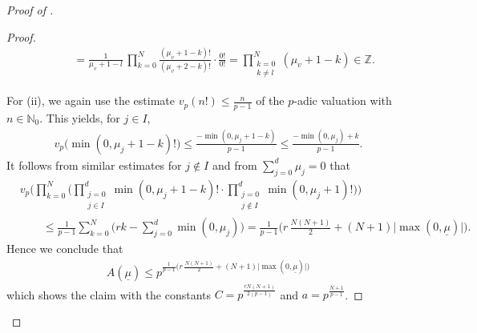\documentclass[a4paper, reqno, 10pt]{amsart}
\theoremstyle{definition}
\numberwithin{equation}{section}
\newcommand{\abs}[1]{{\lvert{#1}\rvert}}
\newcommand{\ul}[1]{{\underline{#1}}}
\newcommand{\BN}{{\mathbb {N}}}
\newcommand{\BZ}{{\mathbb {Z}}}
\begin{document}
\begin{proof}[{Proof of }]
\begin{proof}
\begin{align*}
			&\qquad = \frac{1}{\mu_v +1 - l} \,\prod_{k=0}^N   \frac{(\mu_v +1 -k)!}{(\mu_v +2 -k)!} \cdot \frac{0!}{0!} 
					= \prod_{\substack{k=0 \\ k\neq l}}^N (\mu_v +1 - k) \in \BZ .
	\end{align*}
	
	
	For (ii), we again use the estimate $v_p(n!) \leq \frac{n}{p-1}$ of the $p$-adic valuation with $n\in \BN_0$.
	This yields, for $j\in I$,
	\begin{align*}
		v_p \big( \min(0,\mu_j +1 - k)! \big)
			\leq \frac{- \min (0,\mu_j +1 -k)}{p-1}
			\leq \frac{  - \min(0,\mu_j) + k }{p-1}.
	\end{align*}
	It follows from similar estimates for $j \notin I$ and from $\sum_{j=0}^d \mu_j =0$ that
	\begin{align*}
		&v_p \Bigg( \prod_{k=0}^N  \Bigg( \prod_{\substack{j=0 \\ j\in I}}^d \min(0, \mu_j +1 -k)! \cdot \prod_{\substack{j=0 \\ j\notin I}}^d \min(0, \mu_j +1)! \Bigg) \Bigg) \\
			&\qquad\leq \frac{1}{p-1} \sum_{k=0}^N \bigg( r k - \sum_{j=0}^d \min(0,\mu_j) \bigg)
			= \frac{1}{p-1} \bigg( r \, \frac{N(N+1)}{2} + (N+1) \abs{\max(0,\ul{\mu})} \bigg) .
	\end{align*}
	Hence we conclude that
	\begin{align*}
		A(\ul{\mu}) \leq p^{\frac{1}{p-1} \big( r \, \frac{N(N+1)}{2} + (N+1) \abs{\max(0,\ul{\mu})} \big)}
	\end{align*}
	which shows the claim with the constants $C = p^{\frac{r N (N+1)}{2(p-1)}}$ and $a = p^{\frac{N+1}{p-1}}$.
\end{proof}





\end{proof}
\end{document}

